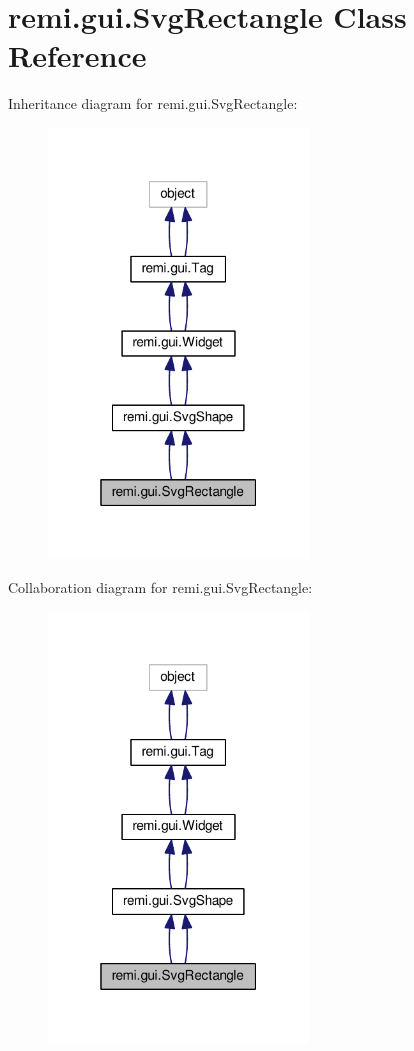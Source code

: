 \hypertarget{classremi_1_1gui_1_1SvgRectangle}{}\section{remi.\+gui.\+Svg\+Rectangle Class Reference}
\label{classremi_1_1gui_1_1SvgRectangle}


Inheritance diagram for remi.\+gui.\+Svg\+Rectangle\+:
\nopagebreak
\begin{figure}[H]
\begin{center}
\leavevmode
\includegraphics[width=196pt]{d0/d82/classremi_1_1gui_1_1SvgRectangle__inherit__graph}
\end{center}
\end{figure}


Collaboration diagram for remi.\+gui.\+Svg\+Rectangle\+:
\nopagebreak
\begin{figure}[H]
\begin{center}
\leavevmode
\includegraphics[width=196pt]{d4/d83/classremi_1_1gui_1_1SvgRectangle__coll__graph}
\end{center}
\end{figure}

